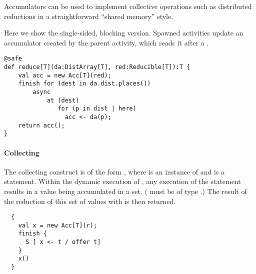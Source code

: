 Accumulators can be used to implement collective operations such as
distributed reductions in a straightforward ``shared memory'' style.

\begin{example}[Reduction]
Here we show the single-sided, blocking version. Spawned activities
update an accumulator created by the parent activity, which reads it
after a . 
  \begin{lstlisting}
@safe
def reduce[T](da:DistArray[T], red:Reducible[T]):T {
    val acc = new Acc[T](red);
    finish for (dest in da.dist.places())
        async
            at (dest) 
               for (p in dist | here)
                 acc <- da(p);
    return acc();
}
\end{lstlisting}
\end{example}



\paragraph{Collecting }

The collecting  construct is of the form , where  is an instance of  and
 is a statement. Within the dynamic execution of , any
execution of the statement  results in a value 
being accumulated in a set. ( must be of type .) The
result of the reduction of this set of  values with 
is then returned.

\begin{lstlisting}
  {
    val x = new Acc[T](r);
    finish {
      S [ x <- t / offer t]
    }
    x()
  }
\end{lstlisting}

